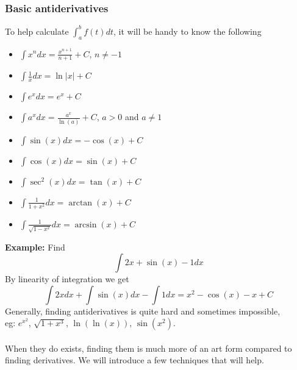 \documentclass[10pt]{article}
\theoremstyle{break}
\begin{document}
\subsubsection{Basic antiderivatives}
To help calculate $\int^b_a f(t) dt$, it will be handy to know the following 
\begin{itemize}
  \item $\int x^n dx = \frac{x^{n+1}}{n+1} + C$, \hspace{3ex} $n \ne -1$
  \item $\int \frac{1}{x} dx = \ln |x| + C$
  \item $\int e^x dx = e^x + C$
  \item $\int a^x dx = \frac{a^x}{\ln(a)} + C$, \hspace{3ex} $a > 0$ and $a \ne 1$
  \item $\int \sin(x) dx = -\cos(x) + C$
  \item $\int \cos(x) dx = \sin(x) + C$
  \item $\int \sec^2(x) dx = \tan(x) + C$
  \item $\int \frac{1}{1+x^2} dx = \arctan(x) + C$
  \item $\int \frac{1}{\sqrt{1-x^2}} dx = \arcsin(x) + C$
\end{itemize}
\vspace{1.5ex}
\textbf{Example: } Find $$\int 2x + \sin(x) - 1 dx$$
By linearity of integration we get $$\int 2x dx + \int \sin(x) dx - \int 1 dx = x^2 - \cos(x) - x + C$$
Generally, finding antiderivatives is quite hard and sometimes impossible,\\
eg: $e^{x^2}$, $\sqrt{1 + x^3}$, $\ln(\ln(x))$, $\sin(x^2)$.\\ \vspace{0.5ex} \\
When they do exists, finding them is much more of an art form compared to finding derivatives. We will introduce a few
techniques that will help.
\end{document}

